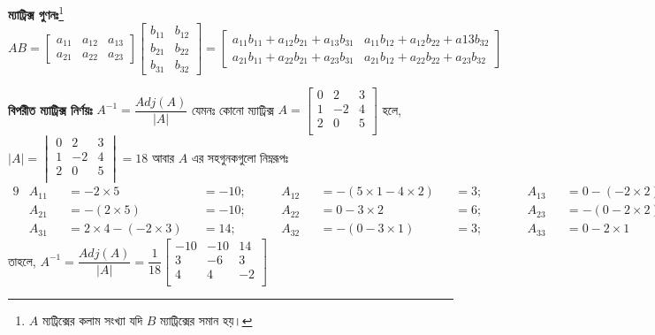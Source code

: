 \documentclass[a4paper,12pt]{article}
\begin{document}
\textbf{ম্যাট্রিক্স গুণনঃ}\footnote{$A$ ম্যট্রিক্সের কলাম সংখ্যা যদি $B$ ম্যাট্রিক্সের সমান হয়।} $AB=\begin{bmatrix}
    a_{11} & a_{12} & a_{13}\\
    a_{21} & a_{22} & a_{23}
    \end{bmatrix}
    \begin{bmatrix}
        b_{11} & b_{12} \\
        b_{21} & b_{22} \\
        b_{31} & b_{32}
    \end{bmatrix}=    
    \begin{bmatrix}
        a_{11}b_{11}+a_{12}b_{21}+a_{13}b_{31} & a_{11}b_{12}+a_{12}b_{22}+a{13}b_{32} \\
        a_{21}b_{11}+a_{22}b_{21}+a_{23}b_{31} & a_{21}b_{12}+a_{22}b_{22}+a_{23}b_{32} 
    \end{bmatrix}$ 

\textbf{বিপরীত ম্যাট্রিক্স নির্ণয়ঃ} $A^{-1}=\dfrac{Adj(A)}{|A|}$ যেমনঃ কোনো ম্যাট্রিক্স $A=\begin{bmatrix}
    0 & 2 & 3\\
    1 & -2 & 4\\
    2 & 0 & 5\\
    \end{bmatrix}$ হলে, $|A|=\begin{vmatrix}
        0 & 2 & 3\\
        1 & -2 & 4\\
        2 & 0 & 5\\
        \end{vmatrix}=18$
আবার $A$ এর সহগুনকগুলো নিম্নরূপঃ
\begin{alignat*}{9}
    &A_{11} &&= -2\times 5 &&= -10; && A_{12} &&= -(5\times 1 -4\times 2)&&= 3; \qquad&& A_{13} &&=0-(-2\times 2) &&=4;\\
    &A_{21} &&= -(2\times 5) &&= -10; && A_{22} &&= 0-3\times 2&&=6; && A_{23}  &&= -(0-2\times 2) &&=4;  \\
    &A_{31} &&= 2\times 4 -(-2\times 3) &&=14; \qquad && A_{32} &&= -(0-3\times 1)&&=3;  && A_{33} &&= 0-2\times 1 &&= -2;
\end{alignat*}
তাহলে, $A^{-1}=\dfrac{Adj(A)}{|A|}=\dfrac{1}{18} \begin{bmatrix}
    -10 & -10 & 14\\
    3 & -6 & 3\\
    4 & 4 & -2\\
    \end{bmatrix}$
\end{document}
